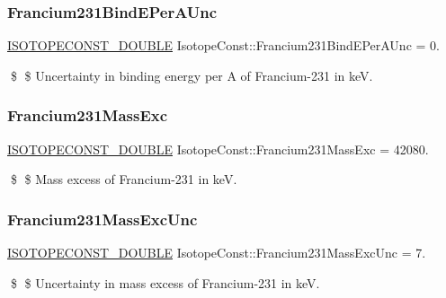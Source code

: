 \subsubsection{\texorpdfstring{Francium231\+Bind\+E\+Per\+A\+Unc}{Francium231BindEPerAUnc}}
{\footnotesize\ttfamily \mbox{\hyperlink{group___isotope_const-_macros_ga8f45a7272ce02c0b4c65c44636ed719a}{I\+S\+O\+T\+O\+P\+E\+C\+O\+N\+S\+T\+\_\+\+D\+O\+U\+B\+LE}} Isotope\+Const\+::\+Francium231\+Bind\+E\+Per\+A\+Unc = 0.}

\$ \$ Uncertainty in binding energy per A of Francium-\/231 in keV. \mbox{\label{group___isotope_const-_francium-_fr231_ga9ba9680f8aad543eef5fa1c40e7799d8}} 
\subsubsection{\texorpdfstring{Francium231\+Mass\+Exc}{Francium231MassExc}}
{\footnotesize\ttfamily \mbox{\hyperlink{group___isotope_const-_macros_ga8f45a7272ce02c0b4c65c44636ed719a}{I\+S\+O\+T\+O\+P\+E\+C\+O\+N\+S\+T\+\_\+\+D\+O\+U\+B\+LE}} Isotope\+Const\+::\+Francium231\+Mass\+Exc = 42080.}

\$ \$ Mass excess of Francium-\/231 in keV. \mbox{\label{group___isotope_const-_francium-_fr231_ga8c7d7ab6243be0468989dc3614eb9c80}} 
\subsubsection{\texorpdfstring{Francium231\+Mass\+Exc\+Unc}{Francium231MassExcUnc}}
{\footnotesize\ttfamily \mbox{\hyperlink{group___isotope_const-_macros_ga8f45a7272ce02c0b4c65c44636ed719a}{I\+S\+O\+T\+O\+P\+E\+C\+O\+N\+S\+T\+\_\+\+D\+O\+U\+B\+LE}} Isotope\+Const\+::\+Francium231\+Mass\+Exc\+Unc = 7.}

\$ \$ Uncertainty in mass excess of Francium-\/231 in keV. \mbox{\label{group___isotope_const-_francium-_fr231_ga1695e87ca03404f39a5b95726589c79f}} 
